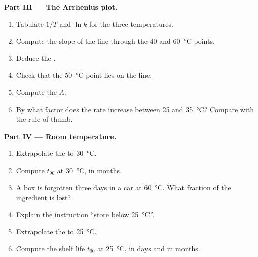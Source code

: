 \begin{problem}
\medskip
\noindent\textbf{Part III --- The Arrhenius plot.}
\begin{enumerate}[resume]
  \item Tabulate $1/T$ and $\ln k$ for the three temperatures.
  \item Compute the slope of the line through the 40 and
        \qty{60}{\celsius} points.
  \item Deduce the .
  \item Check that the \qty{50}{\celsius} point lies on the line.
  \item Compute the  $A$.
  \item By what factor does the rate increase between 25 and
        \qty{35}{\celsius}? Compare with the rule of thumb.
\end{enumerate}

\medskip
\noindent\textbf{Part IV --- Room temperature.}
\begin{enumerate}[resume]
  \item Extrapolate the  to \qty{30}{\celsius}.
  \item Compute $t_{90}$ at \qty{30}{\celsius}, in months.
  \item A box is forgotten three days in a car at \qty{60}{\celsius}. What
        fraction of the ingredient is lost?
  \item Explain the instruction ``store below \qty{25}{\celsius}''.
  \item Extrapolate the  to \qty{25}{\celsius}.
  \item Compute the shelf life $t_{90}$ at \qty{25}{\celsius}, in days and
        in months.
\end{enumerate}
\end{problem}
